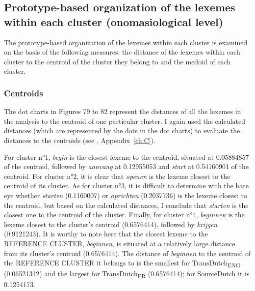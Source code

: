 \subsection{Prototype-based organization of the lexemes within each cluster (onomasiological level)}
\label{sec:4.4.3}  
The prototype-based organization of the lexemes within each cluster is examined on the basis of the following measures: the distance of the lexemes within each cluster to the centroid of the cluster they belong to and the medoid of each cluster.


\subsubsection{Centroids}
\label{sec:4.4.3.1}  
The dot charts in Figures 79 to 82 represent the distances of all the lexemes in the analysis to the centroid of one particular cluster. I again used the calculated distances (which are represented by the dots in the dot charts) to evaluate the distances to the centroids (see , Appendix~\ref{ch:C}).

For cluster n°1, \textit{begin} is the closest lexeme to the centroid, situated at 0.05884857 of the centroid, followed by \textit{aanvang} at 0.12955053 and \textit{start} at 0.54160901 of the centroid. For cluster n°2, it is clear that \textit{openen} is the lexeme closest to the centroid of its cluster. As for cluster n°3, it is difficult to determine with the bare eye whether \textit{starten} (0.1160007) or \textit{oprichten} (0.2037736) is the lexeme closest to the centroid, but based on the calculated distances, I conclude that \textit{starten} is the closest one to the centroid of the cluster. Finally, for cluster n°4, \textit{beginnen} is the lexeme closest to the cluster’s centroid (0.6576414), followed by \textit{krijgen} (0.9121243). It is worthy to note here that the closest lexeme to the REFERENCE CLUSTER, \textit{beginnen}, is situated at a relatively large distance from its cluster’s centroid (0.6576414). The distance of \textit{beginnen} to the centroid of the REFERENCE CLUSTER it belongs to is the smallest for TransDutch\textsubscript{ENG} (0.06521312) and the largest for TransDutch\textsubscript{FR} (0.6576414); for SourceDutch it is 0.1254173.

